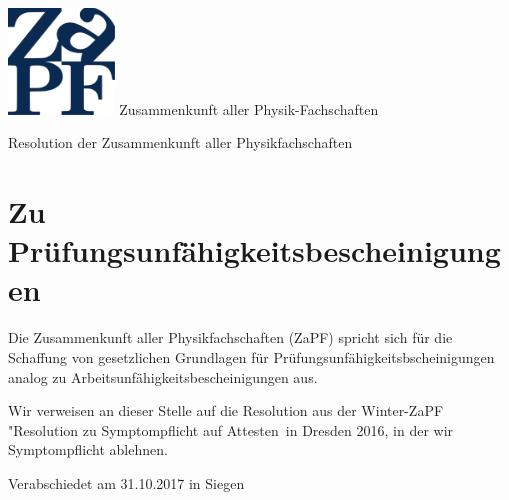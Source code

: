 \documentclass[DIV=calc]{scrartcl}
\begin{document}
    \hspace{0.87\textwidth}
    \begin{minipage}{120pt}
        \vspace{-1.8cm}
        \includegraphics[width=80pt]{../../logo.pdf}
        \centering
        \small Zusammenkunft aller Physik-Fachschaften
    \end{minipage}
    \begin{center}
        \huge{Resolution der Zusammenkunft aller Physikfachschaften}\vspace{.25\baselineskip}\\ %
        \normalsize
    \end{center}
    \vspace{0cm}   

\section*{Zu Prüfungsunfähigkeitsbescheinigungen}


Die Zusammenkunft aller Physikfachschaften (ZaPF) spricht sich für die Schaffung von gesetzlichen Grundlagen für Prüfungsunfähigkeitsbscheinigungen analog zu Arbeitsunfähigkeitsbescheinigungen aus.

Wir verweisen an dieser Stelle auf die Resolution aus der Winter-ZaPF "Resolution zu Symptompflicht auf Attesten\grqq ~in Dresden 2016, in der wir Symptompflicht ablehnen.
\vspace{1cm}




\vspace{-0.5\baselineskip}
    \begin{flushright}
        Verabschiedet am 31.10.2017 in Siegen
    \end{flushright}
   \newpage
  
\end{document}
